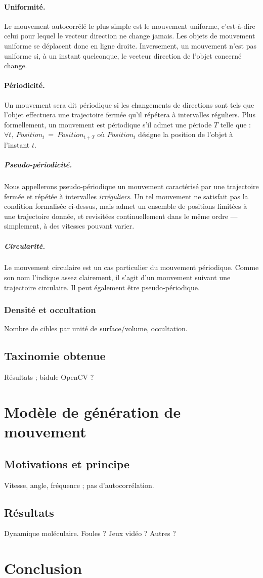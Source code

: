     \paragraph{Uniformité.}
    Le mouvement autocorrélé le plus simple est le mouvement uniforme, c'est-à-dire celui pour lequel le vecteur direction ne change jamais. Les objets de mouvement uniforme se déplacent donc en ligne droite. Inversement, un mouvement n'est pas uniforme si, à un instant quelconque, le vecteur direction de l'objet concerné change.

    \paragraph{Périodicité.}
    Un mouvement sera dit périodique si les changements de directions sont tels que l'objet effectuera une trajectoire fermée qu'il répétera à intervalles réguliers. Plus formellement, un mouvement est périodique s'il admet une période $T$ telle que :
    $\forall t,~Position_{t}~=~Position_{t+T}$ où $Position_{t}$ désigne la position de l'objet à l'instant $t$.
    
    \subparagraph{Pseudo-périodicité.}
    Nous appellerons pseudo-périodique un mouvement caractérisé par une trajectoire fermée et répétée à intervalles \emph{irréguliers}. Un tel mouvement ne satisfait pas la condition formalisée ci-dessus, mais admet un ensemble de positions limitées à une trajectoire donnée, et revisitées continuellement dans le même ordre --- simplement, à des vitesses pouvant varier.

    \subparagraph{Circularité.}
    Le mouvement circulaire est un cas particulier du mouvement périodique. Comme son nom l'indique assez clairement, il s'agit d'un mouvement suivant une trajectoire circulaire. Il peut également être pseudo-périodique.

    \subsubsection{Densité et occultation}
    Nombre de cibles par unité de surface/volume, occultation.

    \subsection{Taxinomie obtenue}
    Résultats ; bidule OpenCV ?

\section{Modèle de génération de mouvement}
    \subsection{Motivations et principe}
    Vitesse, angle, fréquence ; pas d'autocorrélation.

    \subsection{Résultats}
    Dynamique moléculaire. Foules ? Jeux vidéo ? Autres ?


\section{Conclusion}

\clearpage
